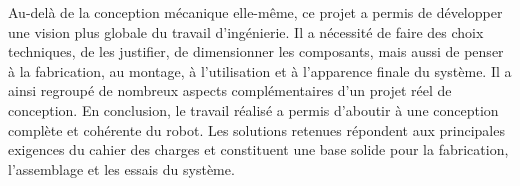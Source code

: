Au-delà de la conception mécanique elle-même, ce projet a permis de développer une vision plus globale du travail d’ingénierie. Il a nécessité de faire des choix techniques, de les justifier, de dimensionner les composants, mais aussi de penser à la fabrication, au montage, à l’utilisation et à l’apparence finale du système. Il a ainsi regroupé de nombreux aspects complémentaires d’un projet réel de conception.
\newline
\newline
En conclusion, le travail réalisé a permis d’aboutir à une conception complète et cohérente du robot. Les solutions retenues répondent aux principales exigences du cahier des charges et constituent une base solide pour la fabrication, l’assemblage et les essais du système.

